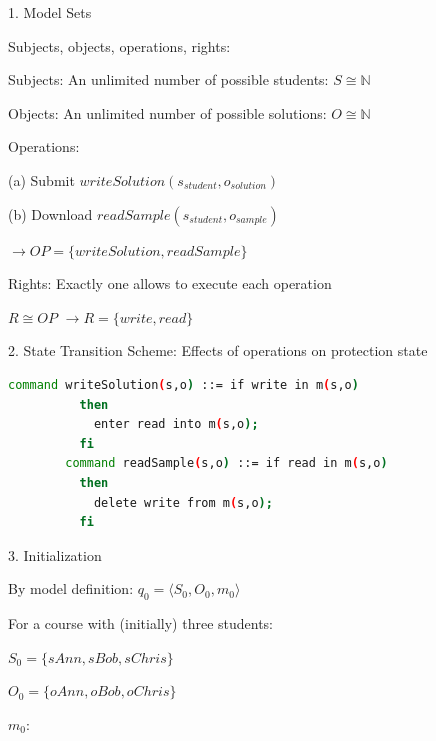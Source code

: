 \documentclass[a4paper]{article}
\begin{document}
\begin{multicols}{3}
    1. Model Sets
    \begin{itemize*}
        \item Subjects, objects, operations, rights:
        \begin{itemize*}
            \item Subjects: An unlimited number of possible students: $S\cong\mathbb{N}$
            \item Objects: An unlimited number of possible solutions: $O\cong\mathbb{N}$
            \item Operations:
            \begin{itemize*}
                \item (a) Submit $writeSolution(s_{student},o_{solution})$
                \item (b) Download $readSample(s_{student},o_{sample})$
                \item $\rightarrow OP=\{writeSolution, readSample\}$
            \end{itemize*}
            \item Rights: Exactly one allows to execute each operation
            \begin{itemize*}
                \item $R\cong OP$ $\rightarrow R=\{write, read\}$
            \end{itemize*}
        \end{itemize*}
    \end{itemize*}
    2. State Transition Scheme: Effects of operations on protection state
    \begin{lstlisting}[language=Bash,showspaces=false]
        command writeSolution(s,o) ::= if write in m(s,o) 
          then 
            enter read into m(s,o);
          fi
        command readSample(s,o) ::= if read in m(s,o)
          then
            delete write from m(s,o);
          fi
  \end{lstlisting}
    3. Initialization
    \begin{itemize*}
        \item By model definition: $q_0 =⟨S_0 ,O_0 ,m_0 ⟩$
        \item For a course with (initially) three students:
        \begin{itemize*}
            \item $S_0 =\{sAnn, sBob, sChris\}$
            \item $O_0 =\{oAnn, oBob, oChris\}$
            \item $m_0$:
            \begin{itemize*}

\end{itemize*}
\end{itemize*}
\end{itemize*}
\end{multicols}
\end{document}
